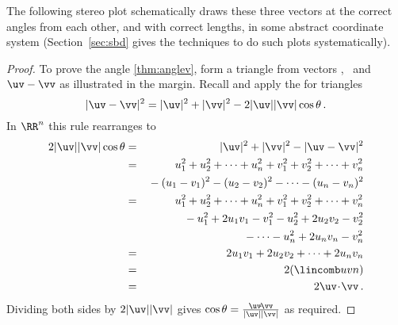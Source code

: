\begin{example}
\begin{solution}
\begin{itemize}
\end{itemize}
The following stereo plot schematically draws these three vectors at the correct angles from each other, and with correct lengths, in some abstract coordinate system (Section~\ref{sec:sbd} gives the techniques to do such plots systematically).
\begin{center}
 {
}
\end{center}
\end{solution}
\end{example}



\begin{proof} 
To prove the angle \autoref{thm:anglev}, form a triangle from vectors \uv, \vv\ and \(\uv-\vv\) as illustrated in the margin.
%
Recall and apply the  for triangles
\begin{equation*}
|\uv-\vv|^2=|\uv|^2+|\vv|^2-2|\uv||\vv|\cos\theta\,.
\end{equation*}
In \(\RR^n\) this rule rearranges to
\begin{eqnarray*}
2|\uv||\vv|\cos\theta
&=&|\uv|^2+|\vv|^2-|\uv-\vv|^2
\\&=&u_1^2+u_2^2+\cdots+u_n^2
+v_1^2+v_2^2+\cdots+v_n^2
\\&&{}
-(u_1-v_1)^2-(u_2-v_2)^2-\cdots-(u_n-v_n)^2
\\&=&u_1^2+u_2^2+\cdots+u_n^2
+v_1^2+v_2^2+\cdots+v_n^2
\\&&{}
-u_1^2+2u_1v_1-v_1^2-u_2^2+2u_2v_2-v_2^2
\\&&{}
-\cdots-u_n^2+2u_nv_n-v_n^2
\\&=&2u_1v_1+2u_2v_2+\cdots+2u_nv_n
\\&=&2(\lincomb uvn)
\\&=&2\uv\cdot\vv\,.
\end{eqnarray*}
Dividing both sides by \(2|\uv||\vv|\) gives \(\cos\theta=\frac{\uv\cdot\vv}{|\uv||\vv|}\) as required.
\end{proof}





